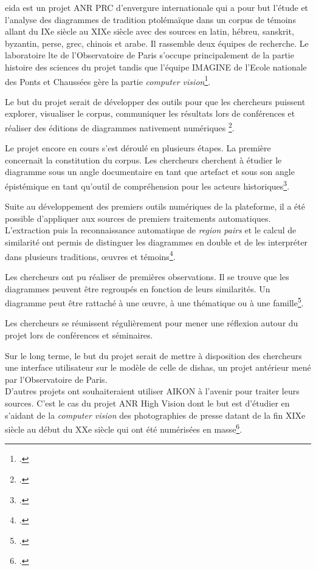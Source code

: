 \gls{eida} est un projet ANR PRC d'envergure internationale qui a pour but l'étude et l'analyse des diagrammes de tradition ptolémaïque dans un corpus de témoins allant du IXe siècle au XIXe siècle avec des sources en latin, hébreu, sanskrit, byzantin, perse, grec, chinois et arabe. Il rassemble deux équipes de recherche. Le laboratoire \gls{lte} de l'Observatoire de Paris s'occupe principalement de la partie histoire des sciences du projet tandis que l'équipe IMAGINE de l'Ecole nationale des Ponts et Chaussées gère la partie \textit{computer vision}\footcite{albouyAIKONComputerVision}. 

Le but du projet serait de développer des outils pour que les chercheurs puissent explorer, visualiser le corpus, communiquer les résultats lors de conférences et réaliser des éditions de diagrammes nativement numériques \footcite{Conference2023EIDA2023}.

Le projet encore en cours s'est déroulé en plusieurs étapes. La première concernait la constitution du corpus. Les chercheurs cherchent à étudier le diagramme sous un angle documentaire en tant que artefact et sous son angle épistémique en tant qu'outil de compréhension pour les acteurs historiques\footcite{Conference2023EIDA2023}.

Suite au développement des premiers outils numériques de la plateforme, il a été possible d'appliquer aux sources de premiers traitements automatiques. L'extraction puis la reconnaissance automatique de \textit{region pairs} et le calcul de similarité ont permis de distinguer les diagrammes en double et de les interpréter dans plusieurs traditions, œuvres et témoins\footcite{Conference2024Graphic2024}.

Les chercheurs ont pu réaliser de premières observations. Il se trouve que les diagrammes peuvent être regroupés en fonction de leurs similarités. Un diagramme peut être rattaché à une œuvre, à une thématique ou à une famille\footcite{Conference2025Long2025}. 

Les chercheurs se réunissent régulièrement pour mener une réflexion autour du projet lors de conférences et séminaires. 
 

Sur le long terme, le but du projet serait de mettre à disposition des chercheurs une interface utilisateur sur le modèle de celle de \gls{dishas}, un projet antérieur mené par l'Observatoire de Paris. \\

D'autres projets ont souhaiteraient utiliser AIKON à l'avenir pour traiter leurs sources. C'est le cas du projet ANR High Vision dont le but est d'étudier en s'aidant de la \textit{computer vision} des photographies de presse datant de la fin XIXe siècle au début du XXe siècle qui ont été numérisées en masse\footcite{HIGHVISIONProjet2025}.



 
